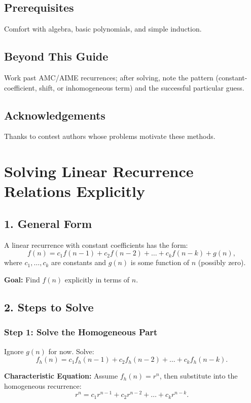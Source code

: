 \documentclass[12pt]{extarticle}
\begin{document}
\subsection*{Prerequisites}
Comfort with algebra, basic polynomials, and simple induction.

\subsection*{Beyond This Guide}
Work past AMC/AIME recurrences; after solving, note the pattern (constant-coefficient, shift, or inhomogeneous term) and the successful particular guess.

\subsection*{Acknowledgements}
Thanks to contest authors whose problems motivate these methods.

\newpage

\section*{Solving Linear Recurrence Relations Explicitly}

\subsection*{1. General Form}

A linear recurrence with constant coefficients has the form:
\[
f(n) = c_1 f(n-1) + c_2 f(n-2) + \dots + c_k f(n-k) + g(n),
\]
where \(c_1, \dots, c_k\) are constants and \(g(n)\) is some function of \(n\) (possibly zero).

\textbf{Goal:} Find \(f(n)\) explicitly in terms of \(n\).

\subsection*{2. Steps to Solve}

\subsubsection*{Step 1: Solve the Homogeneous Part}

Ignore \(g(n)\) for now. Solve:
\[
f_h(n) = c_1 f_h(n-1) + c_2 f_h(n-2) + \dots + c_k f_h(n-k).
\]

\textbf{Characteristic Equation:} Assume \(f_h(n) = r^n\), then substitute into the homogeneous recurrence:
\[
r^n = c_1 r^{n-1} + c_2 r^{n-2} + \dots + c_k r^{n-k}.
\]
\end{document}
